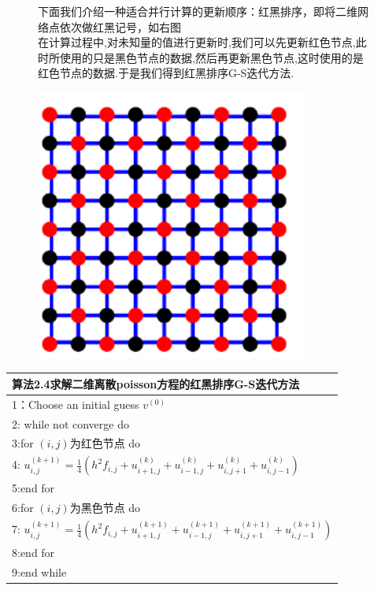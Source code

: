 \documentclass[12pt,a4paper]{article}
\begin{document}
\begin{figure}[h]
\begin{minipage}[l]{0.65\linewidth} 
下面我们介绍一种适合并行计算的更新顺序：{\color{blue}红黑排序}，即将二维网络点依次做红黑记号，如右图\\
在计算过程中,对未知量的值进行更新时,我们可以先更新红色节点,此时所使用的只是黑色节点的数据,然后再更新黑色节点,这时使用的是红色节点的数据.于是我们得到红黑排序G-S迭代方法.\\
\end{minipage} 
\hfill 
\begin{minipage}[t]{0.35\linewidth} 
\centering 
\includegraphics[width=0.8\textwidth]{./figures/figure1.png} 
\end{minipage} 
\end{figure}
\begin{tabular}{l}
\hline
{\color{blue}算法2.4}求解二维离散poisson方程的红黑排序G-S迭代方法\\
\hline
1：Choose an initial guess $v^{(0)}$\\
2: while not converge do\\
3:\qquad for $(i,j)$为红色节点 do\\
4:\qquad \qquad
$u_{i, j}^{(k+1)}=\frac{1}{4}\left(h^{2} f_{i, j}+u_{i+1, j}^{(k)}+u_{i-1, j}^{(k)}+u_{i, j+1}^{(k)}+u_{i, j-1}^{(k)}\right)$\\
5:\qquad end for\\
6:\qquad for $(i,j)$为黑色节点 do\\
7:\qquad \qquad
$u_{i, j}^{(k+1)}=\frac{1}{4}\left(h^{2} f_{i, j}+u_{i+1, j}^{(k+1)}+u_{i-1, j}^{(k+1)}+u_{i, j+1}^{(k+1)}+u_{i, j-1}^{(k+1)}\right)$\\
8:\qquad end for\\
9:end while\\
\hline
\end{tabular}\\
\end{document}
